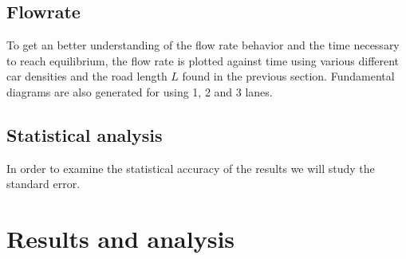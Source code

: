 \documentclass[a4paper,12pt]{article}
\begin{document}
\subsection*{Flowrate}
To get an better understanding of the flow rate behavior and the time necessary to reach equilibrium, the flow rate is plotted against time using various different 
car densities and the road length $L$ found in the previous section. Fundamental diagrams are also generated for using 1, 2 and 3 lanes.

\subsection*{Statistical analysis}
In order to examine the statistical accuracy of the results we will study the standard error. 



\section*{Results and analysis}
\end{document}
